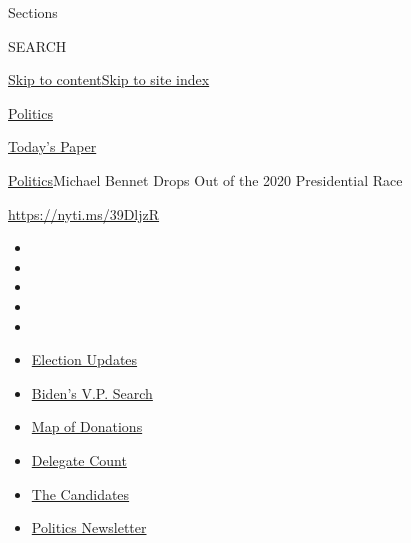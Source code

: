 Sections

SEARCH

\protect\hyperlink{site-content}{Skip to
content}\protect\hyperlink{site-index}{Skip to site index}

\href{https://www.nytimes.com/section/politics}{Politics}

\href{https://myaccount.nytimes.com/auth/login?response_type=cookie\&client_id=vi}{}

\href{https://www.nytimes.com/section/todayspaper}{Today's Paper}

\href{/section/politics}{Politics}\textbar{}Michael Bennet Drops Out of
the 2020 Presidential Race

\url{https://nyti.ms/39DljzR}

\begin{itemize}
\item
\item
\item
\item
\item
\end{itemize}

\begin{itemize}
\item
  \href{https://www.nytimes.com/2020/07/31/us/elections/biden-vs-trump.html?action=click\&pgtype=Article\&state=default\&region=TOP_BANNER\&context=storylines_menu}{Election
  Updates}
\item
  \href{https://www.nytimes.com/article/biden-vice-president-2020.html?action=click\&pgtype=Article\&state=default\&region=TOP_BANNER\&context=storylines_menu}{Biden's
  V.P. Search}
\item
  \href{https://www.nytimes.com/interactive/2020/07/24/us/politics/trump-biden-campaign-donors.html?action=click\&pgtype=Article\&state=default\&region=TOP_BANNER\&context=storylines_menu}{Map
  of Donations}
\item
  \href{https://www.nytimes.com/interactive/2020/us/elections/delegate-count-primary-results.html?action=click\&pgtype=Article\&state=default\&region=TOP_BANNER\&context=storylines_menu}{Delegate
  Count}
\item
  \href{https://www.nytimes.com/interactive/2019/us/politics/2020-presidential-candidates.html?action=click\&pgtype=Article\&state=default\&region=TOP_BANNER\&context=storylines_menu}{The
  Candidates}
\item
  \href{https://www.nytimes.com/newsletters/politics?action=click\&pgtype=Article\&state=default\&region=TOP_BANNER\&context=storylines_menu}{Politics
  Newsletter}
\end{itemize}

